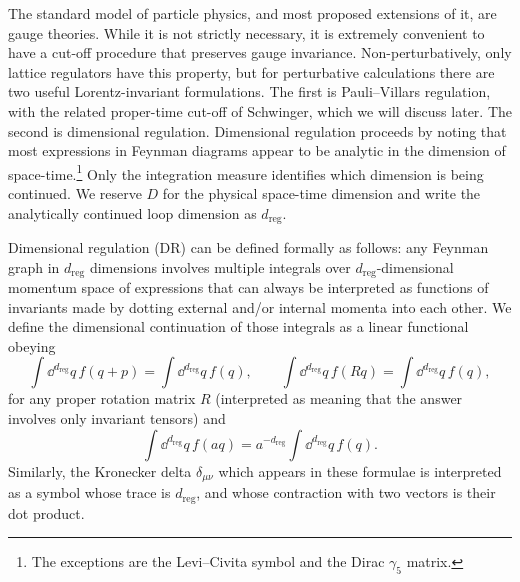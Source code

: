 The standard model of particle physics, and most proposed extensions of it,
are gauge theories. While it is not strictly necessary, it is extremely
convenient to have a cut-off procedure that preserves gauge invariance.
Non-perturbatively, only lattice regulators have this property, but for
perturbative calculations there are two useful Lorentz-invariant formulations.
The first is Pauli--Villars regulation, with the related proper-time cut-off
of Schwinger, which we will discuss later. The second is dimensional
regulation. Dimensional regulation proceeds by noting that most expressions
in Feynman diagrams appear to be analytic in the dimension of space-time.\footnote[4]{The
exceptions are the Levi--Civita symbol and the Dirac $\gamma_5$ matrix.} Only
the integration measure identifies which dimension is being continued. We reserve
$D$ for the physical space-time dimension and write the analytically continued
loop dimension as $d_{\mathrm{reg}}$.

Dimensional regulation (DR) can be defined formally as follows: any Feynman
graph in $d_{\mathrm{reg}}$ dimensions involves multiple integrals over
$d_{\mathrm{reg}}$-dimensional
momentum space of expressions that can always be interpreted as functions of
invariants made by dotting external and/or internal momenta into each other.
We define the dimensional continuation of those integrals as a linear
functional obeying
\[
  \int\!\dd^{d_{\mathrm{reg}}}q\,f(q+p)=\int\!\dd^{d_{\mathrm{reg}}}q\,f(q),
  \qquad
  \int\!\dd^{d_{\mathrm{reg}}}q\,f(Rq)=\int\!\dd^{d_{\mathrm{reg}}}q\,f(q),
\]
for any proper rotation matrix $R$ (interpreted as meaning that the answer
involves only invariant tensors) and
\[
  \int\!\dd^{d_{\mathrm{reg}}}q\,f(aq)=a^{-d_{\mathrm{reg}}}
  \int\!\dd^{d_{\mathrm{reg}}}q\,f(q).
\]
Similarly, the Kronecker delta $\delta_{\mu\nu}$ which appears in these
formulae is interpreted as a symbol whose trace is $d_{\mathrm{reg}}$, and whose contraction
with two vectors is their dot product.

